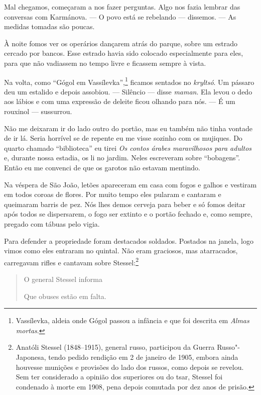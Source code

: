 Mal chegamos, começaram a nos fazer perguntas. Algo nos fazia lembrar
das conversas com Karmánova. --- O povo está se rebelando --- dissemos.
--- As medidas tomadas são poucas.

À noite fomos ver os operários dançarem atrás do parque, sobre um
estrado cercado por bancos. Esse estrado havia sido colocado
especialmente para eles, para que não vadiassem no tempo livre e
ficassem sempre à vista.

Na volta, como ``Gógol em Vassílevka'',\footnote{Vassílevka, aldeia onde
  Gógol passou a infância e que foi descrita em \emph{Almas mortas}.}
ficamos sentados no \emph{kryltsó}. Um pássaro deu um estalido e depois
assobiou. --- Silêncio --- disse \emph{maman}. Ela levou o dedo aos
lábios e com uma expressão de deleite ficou olhando para nós. --- É um
rouxinol --- sussurrou.

Não me deixaram ir do lado outro do portão, mas eu também não tinha %
vontade de ir lá. Seria horrível se de repente eu me visse sozinho com
os mujiques. Do quarto chamado ``biblioteca'' eu tirei \emph{Os contos
árabes maravilhosos para adultos} e, durante nossa estadia, os li no
jardim. Neles escreveram sobre ``bobagens''. Então eu me convenci de que
os garotos não estavam mentindo.

Na véspera de São João, letões apareceram em casa com fogos e galhos e
vestiram em todos coroas de flores. Por muito tempo eles pularam e
cantaram e queimaram barris de pez. Nós lhes demos cerveja para beber e %
só fomos deitar após todos se dispersarem, o fogo ser extinto e o portão
fechado e, como sempre, pregado com tábuas pelo vigia.

Para defender a propriedade foram destacados soldados. Postados na
janela, logo vimos como eles entraram no quintal. Não eram graciosos,
mas atarracados, carregavam rifles e cantavam sobre Stessel:\footnote{Anatóli
  Stessel (1848--1915), general russo, participou da Guerra
  Russo"-Japonesa, tendo pedido rendição em 2 de janeiro de 1905, embora
  ainda houvesse munições e provisões do lado dos russos, como depois se
  revelou. Sem ter considerado a opinião dos superiores ou do tsar,
  Stessel foi condenado à morte em 1908, pena depois comutada por dez
  anos de prisão.}

\pagebreak

\begin{quotation}
O general Stessel informa

Que obuses estão em falta.
\end{quotation}

